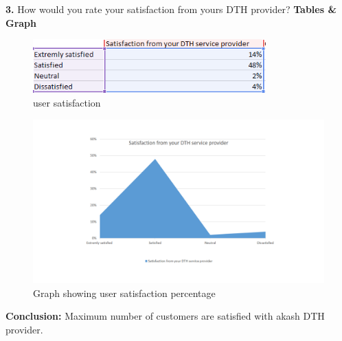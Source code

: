\begin{spacing}{1}
{\bf 3.} How would you rate your satisfaction from yours DTH provider?\newline
{\bf Tables \& Graph}\newline
\begin{figure}[H]
	\centering
	\includegraphics[width=0.8\textwidth]{fig3_2}
	\caption{user satisfaction}
	\label{fig:Table2}
\end{figure}
\begin{figure}[H]
	\centering
	\includegraphics[width=1.2\textwidth]{fig3_1}
	\caption{Graph showing user satisfaction percentage}
	\label{fig:g1}
\end{figure}
{\bf Conclusion: }\newline
Maximum number of customers are satisfied with akash DTH provider.


\end{spacing}
